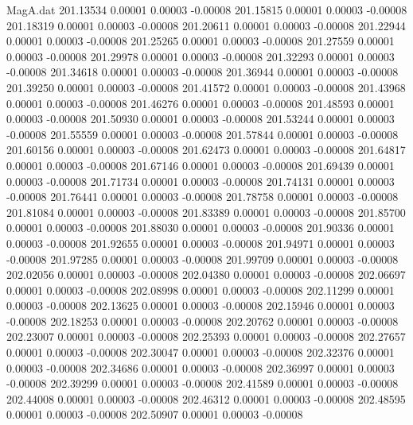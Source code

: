 \begin{filecontents}{MagA.dat}
 201.13534    0.00001    0.00003   -0.00008
 201.15815    0.00001    0.00003   -0.00008
 201.18319    0.00001    0.00003   -0.00008
 201.20611    0.00001    0.00003   -0.00008
 201.22944    0.00001    0.00003   -0.00008
 201.25265    0.00001    0.00003   -0.00008
 201.27559    0.00001    0.00003   -0.00008
 201.29978    0.00001    0.00003   -0.00008
 201.32293    0.00001    0.00003   -0.00008
 201.34618    0.00001    0.00003   -0.00008
 201.36944    0.00001    0.00003   -0.00008
 201.39250    0.00001    0.00003   -0.00008
 201.41572    0.00001    0.00003   -0.00008
 201.43968    0.00001    0.00003   -0.00008
 201.46276    0.00001    0.00003   -0.00008
 201.48593    0.00001    0.00003   -0.00008
 201.50930    0.00001    0.00003   -0.00008
 201.53244    0.00001    0.00003   -0.00008
 201.55559    0.00001    0.00003   -0.00008
 201.57844    0.00001    0.00003   -0.00008
 201.60156    0.00001    0.00003   -0.00008
 201.62473    0.00001    0.00003   -0.00008
 201.64817    0.00001    0.00003   -0.00008
 201.67146    0.00001    0.00003   -0.00008
 201.69439    0.00001    0.00003   -0.00008
 201.71734    0.00001    0.00003   -0.00008
 201.74131    0.00001    0.00003   -0.00008
 201.76441    0.00001    0.00003   -0.00008
 201.78758    0.00001    0.00003   -0.00008
 201.81084    0.00001    0.00003   -0.00008
 201.83389    0.00001    0.00003   -0.00008
 201.85700    0.00001    0.00003   -0.00008
 201.88030    0.00001    0.00003   -0.00008
 201.90336    0.00001    0.00003   -0.00008
 201.92655    0.00001    0.00003   -0.00008
 201.94971    0.00001    0.00003   -0.00008
 201.97285    0.00001    0.00003   -0.00008
 201.99709    0.00001    0.00003   -0.00008
 202.02056    0.00001    0.00003   -0.00008
 202.04380    0.00001    0.00003   -0.00008
 202.06697    0.00001    0.00003   -0.00008
 202.08998    0.00001    0.00003   -0.00008
 202.11299    0.00001    0.00003   -0.00008
 202.13625    0.00001    0.00003   -0.00008
 202.15946    0.00001    0.00003   -0.00008
 202.18253    0.00001    0.00003   -0.00008
 202.20762    0.00001    0.00003   -0.00008
 202.23007    0.00001    0.00003   -0.00008
 202.25393    0.00001    0.00003   -0.00008
 202.27657    0.00001    0.00003   -0.00008
 202.30047    0.00001    0.00003   -0.00008
 202.32376    0.00001    0.00003   -0.00008
 202.34686    0.00001    0.00003   -0.00008
 202.36997    0.00001    0.00003   -0.00008
 202.39299    0.00001    0.00003   -0.00008
 202.41589    0.00001    0.00003   -0.00008
 202.44008    0.00001    0.00003   -0.00008
 202.46312    0.00001    0.00003   -0.00008
 202.48595    0.00001    0.00003   -0.00008
 202.50907    0.00001    0.00003   -0.00008

\end{filecontents}
